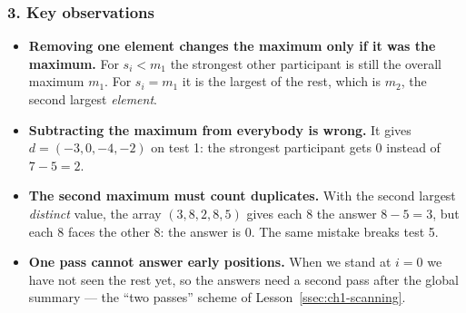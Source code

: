 \begin{diagrambox}
\end{diagrambox}

\subsubsection*{3. Key observations}

\begin{itemize}[leftmargin=*]
    \item \textbf{Removing one element changes the maximum only if it was the maximum.} For $s_i < m_1$ the strongest other participant is still the overall maximum $m_1$. For $s_i = m_1$ it is the largest of the rest, which is $m_2$, the second largest \emph{element}.
    \item \textbf{Subtracting the maximum from everybody is wrong.} It gives $d = (-3, 0, -4, -2)$ on test 1: the strongest participant gets $0$ instead of $7 - 5 = 2$.
    \item \textbf{The second maximum must count duplicates.} With the second largest \emph{distinct} value, the array $(3, 8, 2, 8, 5)$ gives each 8 the answer $8 - 5 = 3$, but each 8 faces the other 8: the answer is $0$. The same mistake breaks test 5.
    \item \textbf{One pass cannot answer early positions.} When we stand at $i = 0$ we have not seen the rest yet, so the answers need a second pass after the global summary --- the ``two passes'' scheme of Lesson~\ref{ssec:ch1-scanning}.
\end{itemize}

